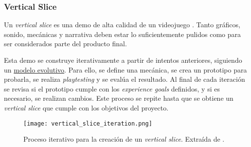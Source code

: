 \subsubsection{Vertical Slice}
Un \textit{vertical slice} es una demo de alta calidad de un videojuego \cite{lemarchandPlayfulProductionProcess2021}. Tanto gráficos, sonido, mecánicas y narrativa deben estar lo suficientemente pulidos como para ser considerados parte del producto final. 
\par Esta demo se construye iterativamente a partir de intentos anteriores, siguiendo un \hyperref[sec:modelos_evolutivos]{modelo evolutivo}. Para ello, se define una mecánica, se crea un prototipo para probarla, se realiza \textit{playtesting} y se evalúa el resultado. Al final de cada iteración se revisa si el prototipo cumple con los \textit{experience goals} definidos, y si es necesario, se realizan cambios. Este proceso se repite hasta que se obtiene un \textit{vertical slice} que cumple con los objetivos del proyecto.
\begin{figure}[h]
    \centering
    \texttt{[image: vertical\_slice\_iteration.png]}
    \caption{Proceso iterativo para la creación de un \textit{vertical slice}. Extraída de \cite{lemarchandPlayfulProductionProcess2021}.}
    \label{fig:x iteracion vertical slice}
\end{figure} 
